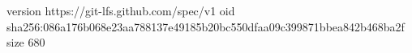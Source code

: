 version https://git-lfs.github.com/spec/v1
oid sha256:086a176b068e23aa788137e49185b20bc550dfaa09c399871bbea842b468ba2f
size 680
